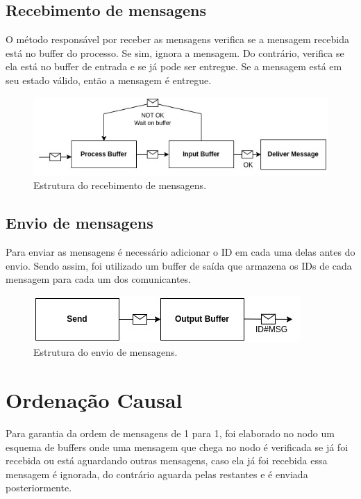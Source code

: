 \documentclass[
	12pt,				%
	openright,			%
	oneside,			%
	a4paper,			%
	english,			%
	french,				%
	spanish,			%
	brazil				%
	]{abntex2}
\begin{document}
\subsection{Recebimento de mensagens}
O método responsável por receber as mensagens verifica se a mensagem recebida
está no buffer do processo. Se sim, ignora a mensagem. Do contrário, verifica se
ela está no buffer de entrada e se já pode ser entregue. Se a mensagem está em seu estado válido,
então a mensagem é entregue.

\begin{figure}[!h]
    \centering
    \includegraphics[scale=0.8]{recv.jpg}
    \caption{Estrutura do recebimento de mensagens.}
    \label{fig:recv}
\end{figure}

\subsection{Envio de mensagens}
Para enviar as mensagens é necessário adicionar o ID em cada uma delas antes do envio.
Sendo assim, foi utilizado um buffer de saída que armazena os IDs de cada mensagem para cada um dos
comunicantes.
\begin{figure}[!h]
    \centering
    \includegraphics[scale=0.8]{send.jpg}
    \caption{Estrutura do envio de mensagens.}
    \label{fig:send}
\end{figure}

\section{Ordenação Causal}
Para garantia da ordem de mensagens de 1 para 1, foi elaborado 
no nodo um esquema de buffers onde uma mensagem que chega no nodo  
é verificada se já foi recebida ou está aguardando outras mensagens,
caso ela já foi recebida essa mensagem é ignorada, do contrário aguarda
pelas restantes e é enviada posteriormente.
\end{document}
